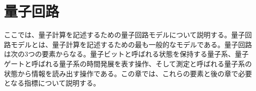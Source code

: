 \chapter{量子回路}\label{chap:quantum-circuit}

ここでは、量子計算を記述するための量子回路モデルについて説明する。量子回路モデルとは、量子計算を記述するための最も一般的なモデルである。量子回路は次の3つの要素からなる。量子ビットと呼ばれる状態を保持する量子系、量子ゲートと呼ばれる量子系の時間発展を表す操作、そして測定と呼ばれる量子系の状態から情報を読み出す操作である。この章では、これらの要素と後の章で必要となる指標について説明する。


\begin{comment}
From Nielsen and Chuang's book Quantum Computation and Quantum Information~\cite{nielsen2000quantum}.

\section{Postulates of Quantum dynamics}
\subsection{State space}
\textbf{Postulate 1}: Any isolated physical system is described by a state vector in the state space known as the Hilbert space.\\

\subsection{Evolution}
\textbf{Postulate 2}: The evolution of a closed quantum system is described by a unitary transformation:
\[
    \ket{\psi(t_2)} = U(t_1, t_2)\ket{\psi(t_1)}
\]
\textbf{Postulate $2^\prime$}: The evolution of the state of a closed system is described by the \textit{Schr\"{o}dinger equation}:
\[
    i\hbar\frac{d\ket{\psi}}{dt} = H\ket{\psi}
\]
$U(t_1, t_2)$ is given by:
\[
    U(t_1, t_2) = \exp \qty( \frac{-iH(t_2-t_1)}{\hbar} )
\]
In some cases, the system is not closed, that is, the Hamiltonian of the system is not constant. However, when we can write down the time-varying Hamiltonian, the system evolve according to the Schr\"{o}dinger equation with the time-varying Hamiltonian.\\

\subsection{Quantum measurememnt}
\textbf{Postulate 3}: Quantum measurements are described by a collection $\{M_m\}$ of measurement operators. These are operators acting on the state space of the system being measured. The index m refers to the measurement outcomes that may occur in the experiment. If the state of the quantum system is $\ket{\psi}$ immediately before the measurement then the probability that result m occurs is given by
$p(m) = \expval{M\dg_m M_m}{\psi}$ , and the state of the system after the measurement is
\[
\frac{M_m\ket{\psi}}{\sqrt{\expval{M\dg_m M_m}{\psi}}}
\]
The measurement operators satisfy the completeness equation, $\sum_m M\dg_m M_m = \bbid$.


\end{comment}
